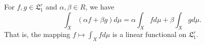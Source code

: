 For $f, g \in \mathfrak{L}_1^r$ and $\alpha, \beta \in R$, we have $$\int_X (\alpha f + \beta g) d\mu = \alpha \int_X f d\mu + \beta \int_X g d\mu.$$ That is, the mapping $f \mapsto \int_X f d\mu$ is a linear functional on $\mathfrak{L}_1^r$.
